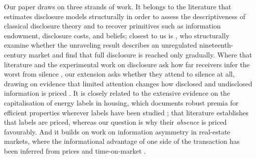 Our paper draws on three strands of work. It belongs to the literature that estimates
disclosure models structurally in order to assess the descriptiveness of classical disclosure
theory and to recover primitives such as information endowment, disclosure costs, and beliefs;
closest to us is \citet{bourveau_learning_2025}, who structurally examine whether the unraveling
result describes an unregulated nineteenth-century market and find that full disclosure is
reached only gradually. Where that literature and the experimental work on disclosure ask how far
receivers infer the worst from silence \citep{jin_is_2021, hagenbach_motivated_2025}, our extension
asks whether they attend to silence at all, drawing on evidence that limited attention changes how
disclosed and undisclosed information is priced \citep{hirshleifer_limited_2003, dellavigna_investor_2009}.
It is closely related to the extensive evidence on the capitalisation of energy labels in
housing, which documents robust premia for efficient properties wherever labels have been
studied \citep{brounen_kok_2011, hyland_lyons_2013, fuerst_energy_2016, frondel_power_2018,
myers_mandatory_2022}; that literature establishes that labels are priced, whereas our question
is why their \emph{absence} is priced favourably. And it builds on work on information
asymmetry in real-estate markets, where the informational advantage of one side of the
transaction has been inferred from prices and time-on-market \citep{levitt_syverson_2008,
lizzeri_1999}.
